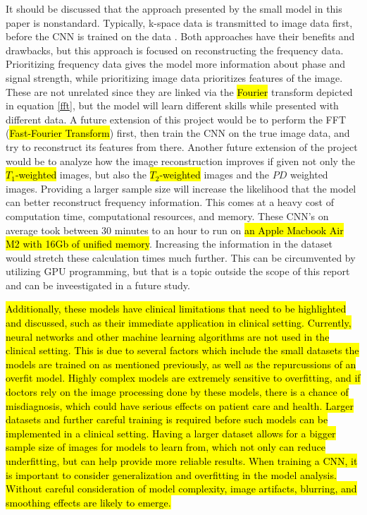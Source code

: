 \documentclass[14pt]{extreport}
\begin{document}
        It should be discussed that the approach presented by the small model in this paper is nonstandard. Typically, k-space data is transmitted to image data first, before the CNN is trained on the data \cite{Wang_Su_Ying_Peng_Zhu_Liang_Feng_Liang_2016}. Both approaches have their benefits and drawbacks, but this approach is focused on reconstructing the frequency data. Prioritizing frequency data gives the model more information about phase and signal strength, while prioritizing image data prioritizes features of the image. These are not unrelated since they are linked via the \hl{Fourier} transform depicted in equation \eqref{fft}, but the model will learn different skills while presented with different data. A future extension of this project would be to perform the FFT (\hl{Fast-Fourier Transform}) first, then train the CNN on the true image data, and try to reconstruct its features from there. Another future extension of the project would be to analyze how the image reconstruction improves if given not only the \hl{$T_1$-weighted} images, but also the \hl{$T_2$-weighted} images and the $PD$ weighted images. Providing a larger sample size will increase the likelihood that the model can better reconstruct frequency information. This comes at a heavy cost of computation time, computational resources, and memory. These CNN's on average took between 30 minutes to an hour to run on \hl{an Apple Macbook Air M2 with 16Gb of unified memory}. Increasing the information in the dataset would stretch these calculation times much further. This can be circumvented by utilizing GPU programming, but that is a topic outside the scope of this report and can be inveestigated in a future study.

        \hl{Additionally, these models have clinical limitations that need to be highlighted and discussed, such as their immediate application in clinical setting. Currently, neural networks and other machine learning algorithms are not used in the clinical setting. This is due to several factors which include the small datasets the models are trained on as mentioned previously, as well as the repurcussions of an overfit model. Highly complex models are extremely sensitive to overfitting, and if doctors rely on the image processing done by these models, there is a chance of misdiagnosis, which could have serious effects on patient care and health. Larger datasets and further careful training is required before such models can be implemented in a clinical setting. Having a larger dataset allows for a bigger sample size of images for models to learn from, which not only can reduce underfitting, but can help provide more reliable results. When training a CNN, it is important to consider generalization and overfitting in the model analysis. Without careful consideration of model complexity, image artifacts, blurring, and smoothing effects are likely to emerge.}
    
\end{document}

